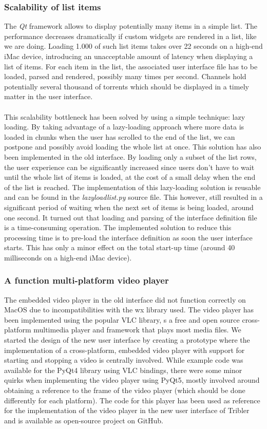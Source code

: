 \subsubsection{\textbf{Scalability of list items}}
The \emph{Qt} framework allows to display potentially many items in a simple list. The performance decreases dramatically if custom widgets are rendered in a list, like we are doing. Loading 1.000 of such list items takes over 22 seconds on a high-end iMac device, introducing an unacceptable amount of latency when displaying a list of items. For each item in the list, the associated user interface file has to be loaded, parsed and rendered, possibly many times per second. Channels hold potentially several thousand of torrents which should be displayed in a timely matter in the user interface.\\\\
This scalability bottleneck has been solved by using a simple technique: lazy loading. By taking advantage of a lazy-loading approach where more data is loaded in chunks when the user has scrolled to the end of the list, we can postpone and possibly avoid loading the whole list at once. This solution has also been implemented in the old interface. By loading only a subset of the list rows, the user experience can be significantly increased since users don't have to wait until the whole list of items is loaded, at the cost of a small delay when the end of the list is reached. The implementation of this lazy-loading solution is reusable and can be found in the \emph{lazyloadlist.py} source file. This however, still resulted in a significant period of waiting when the next set of items is being loaded, around one second. It turned out that loading and parsing of the interface definition file is a time-consuming operation. The implemented solution to reduce this processing time is to pre-load the interface definition as soon the user interface starts. This has only a minor effect on the total start-up time (around 40 milliseconds on a high-end iMac device).

\subsubsection{\textbf{A function multi-platform video player}}
The embedded video player in the old interface did not function correctly on MacOS due to incompatibilities with the wx library used. The video player has been implemented using the popular VLC library\cite{vlcwebsite}, s a free and open source cross-platform multimedia player and framework that plays most media files. We started the design of the new user interface by creating a prototype where the implementation of a cross-platform, embedded video player with support for starting and stopping a video is centrally involved. While example code was available for the PyQt4 library using VLC bindings, there were some minor quirks when implementing the video player using PyQt5, mostly involved around obtaining a reference to the frame of the video player (which should be done differently for each platform). The code for this player has been used as reference for the implementation of the video player in the new user interface of Tribler and is available as open-source project on GitHub\cite{vos2016vlc}.

